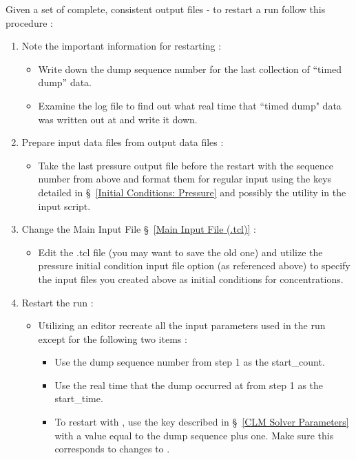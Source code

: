 Given a set of complete, consistent output files - to restart a run follow
this procedure :

\begin{enumerate}
   \item Note the important information for restarting :
   \begin{itemize}
      \item Write down the dump sequence number for the last collection of
           ``timed dump'' data.
      \item Examine the log file to find out what real time that ``timed dump"
            data was written out at and write it down.
   \end{itemize}
   \item Prepare input data files from output data files :
   \begin{itemize}
      \item Take the last pressure output file before the restart with the sequence number
            from above and format them for regular input using the keys detailed in \S~\ref{Initial Conditions: Pressure} and possibly the  utility in the input script.
   \end{itemize}
   \item Change the Main Input File \S~\ref{Main Input File (.tcl)} :
   \begin{itemize}
      \item Edit the .tcl file (you may want to save the old one) and
            utilize the pressure initial condition input file option (as referenced above) to specify
             the input files you created above as initial conditions
            for concentrations.
   \end{itemize}
   \item Restart the run :
   \begin{itemize}
      \item Utilizing an editor recreate all the input parameters used
            in the run except for the following two items :
            \begin{itemize}
               \item Use the dump sequence number from step 1
                     as the start\_count.
               \item Use the real time that the dump occurred at from step 1
                     as the start\_time.
	     \item To restart with , use the  key described in \S~\ref{CLM Solver Parameters} with a value equal to the dump sequence plus one. Make sure this corresponds to changes to . 
            \end{itemize}
   \end{itemize}
\end{enumerate}

